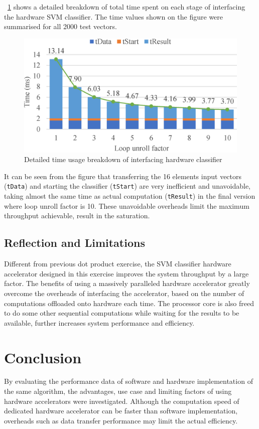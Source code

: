 \documentclass[journal]{IEEEtran}
\newcommand{\fref}[1]{\figurename~\ref{#1}}
\begin{document}
\fref{fig:time} shows a detailed breakdown of total time spent on each stage of interfacing the hardware SVM classifier. The time values shown on the figure were summarised for all 2000 test vectors.

\begin{figure}[t]
	\centering
	\includegraphics[width=0.8\columnwidth]{time}
	\caption{Detailed time usage breakdown of interfacing hardware classifier}
	\label{fig:time}
\end{figure}

It can be seen from the figure that transferring the 16 elements input vectors (\texttt{tData}) and starting the classifier (\texttt{tStart}) are very inefficient and unavoidable, taking almost the same time as actual computation (\texttt{tResult}) in the final version where loop unroll factor is 10. These unavoidable overheads limit the maximum throughput achievable, result in the saturation.

\subsection{Reflection and Limitations}

Different from previous dot product exercise, the SVM classifier hardware accelerator designed in this exercise improves the system throughput by a large factor. The benefits of using a massively paralleled hardware accelerator greatly overcome the overheads of interfacing the accelerator, based on the number of computations offloaded onto hardware each time. The processor core is also freed to do some other sequential computations while waiting for the results to be available, further increases system performance and efficiency.

\section{Conclusion}

By evaluating the performance data of software and hardware implementation of the same algorithm, the advantages, use case and limiting factors of using hardware accelerators were investigated. Although the computation speed of dedicated hardware accelerator can be faster than software implementation, overheads such as data transfer performance may limit the actual efficiency.




\end{document}
